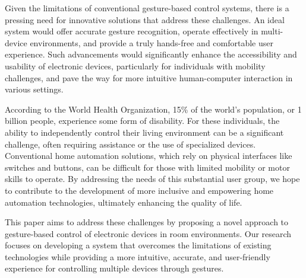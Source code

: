 Given the limitations of conventional gesture-based control systems, there is a pressing need for innovative solutions that address these challenges. An ideal system would offer accurate gesture recognition, operate effectively in multi-device environments, and provide a truly hands-free and comfortable user experience. Such advancements would significantly enhance the accessibility and usability of electronic devices, particularly for individuals with mobility challenges, and pave the way for more intuitive human-computer interaction in various settings.

According to the World Health Organization, 15\% of the world’s population, or 1
billion people, experience some form of disability. For these individuals, the ability
to independently control their living environment can be a significant challenge, often
requiring assistance or the use of specialized devices. Conventional home automation
solutions, which rely on physical interfaces like switches and buttons, can be difficult
for those with limited mobility or motor skills to operate. By addressing the needs of
this substantial user group, we hope to contribute to the development of more inclusive
and empowering home automation technologies, ultimately enhancing the quality of
life.

This paper aims to address these challenges by proposing a novel approach to gesture-based control of electronic devices in room environments. Our research focuses on developing a system that overcomes the limitations of existing technologies while providing a more intuitive, accurate, and user-friendly experience for controlling multiple devices through gestures.




